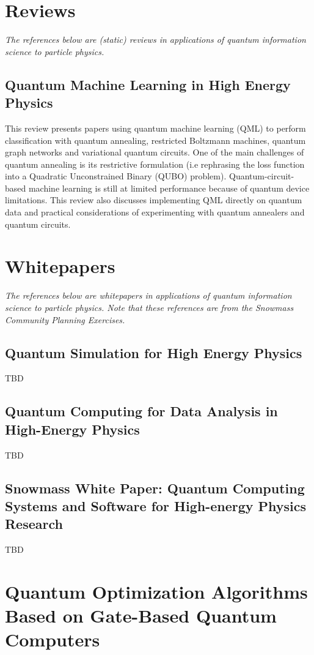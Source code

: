 \section{Reviews}

\textit{The references below are (static) reviews in applications of quantum information science to particle physics.}

\subsection{Quantum Machine Learning in High Energy Physics~\cite{Guan:2020bdl}}
This review presents papers using quantum machine learning (QML) to perform classification with quantum annealing, restricted Boltzmann machines, quantum graph networks and variational quantum circuits. One of the main challenges of quantum annealing is its restrictive formulation (i.e rephrasing the loss function into a Quadratic Unconstrained Binary (QUBO) problem). Quantum-circuit-based machine learning is still at limited performance because of quantum device limitations. This review also discusses implementing QML directly on quantum data and practical considerations of experimenting with quantum annealers and quantum circuits.


\section{Whitepapers}

\textit{The references below are whitepapers in applications of quantum information science to particle physics. Note that these references are from the Snowmass Community Planning Exercises.}

\subsection{Quantum Simulation for High Energy Physics~\cite{Bauer:2022hpo}}
TBD
\subsection{Quantum Computing for Data Analysis in High-Energy Physics~\cite{Delgado:2022tpc}}
TBD
\subsection{Snowmass White Paper: Quantum Computing Systems and Software for High-energy Physics Research~\cite{Humble:2022vtm}}
TBD


\section{Quantum Optimization Algorithms Based on Gate-Based Quantum Computers}

